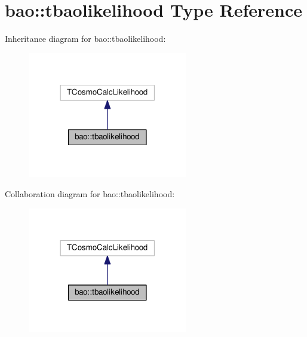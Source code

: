 \hypertarget{structbao_1_1tbaolikelihood}{}\section{bao\+:\+:tbaolikelihood Type Reference}
\label{structbao_1_1tbaolikelihood}


Inheritance diagram for bao\+:\+:tbaolikelihood\+:
\nopagebreak
\begin{figure}[H]
\begin{center}
\leavevmode
\includegraphics[width=198pt]{structbao_1_1tbaolikelihood__inherit__graph}
\end{center}
\end{figure}


Collaboration diagram for bao\+:\+:tbaolikelihood\+:
\nopagebreak
\begin{figure}[H]
\begin{center}
\leavevmode
\includegraphics[width=198pt]{structbao_1_1tbaolikelihood__coll__graph}
\end{center}
\end{figure}

